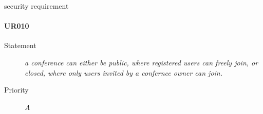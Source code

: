 security requirement
\paragraph{UR010}
\begin{description}
  \item [Statement] 
    \textit{a conference can either be public, where registered users can freely join, or closed, where only users invited by a confernce owner can join.}
  \item [Priority] \textit{A}
\end{description}




